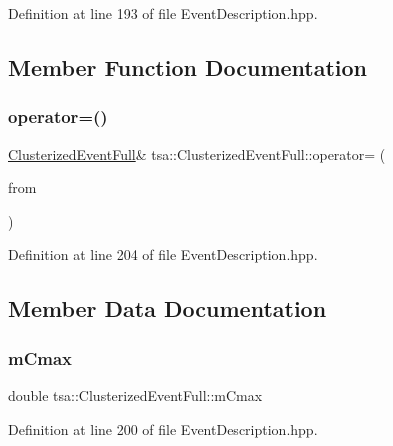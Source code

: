 Definition at line 193 of file Event\+Description.\+hpp.



\subsection{Member Function Documentation}
\mbox{\label{classtsa_1_1_clusterized_event_full_a59d5af3b33fe416f076a71e127e55e4b}} 
\subsubsection{\texorpdfstring{operator=()}{operator=()}}
{\footnotesize\ttfamily \hyperlink{classtsa_1_1_clusterized_event_full}{Clusterized\+Event\+Full}\& tsa\+::\+Clusterized\+Event\+Full\+::operator= (\begin{DoxyParamCaption}\item[{const \hyperlink{classtsa_1_1_clusterized_event_full}{Clusterized\+Event\+Full} \&}]{from }\end{DoxyParamCaption})\hspace{0.3cm}{\ttfamily [inline]}}



Definition at line 204 of file Event\+Description.\+hpp.



\subsection{Member Data Documentation}
\mbox{\label{classtsa_1_1_clusterized_event_full_a79694874453fcf2219e339c3d131ba27}} 
\subsubsection{\texorpdfstring{m\+Cmax}{mCmax}}
{\footnotesize\ttfamily double tsa\+::\+Clusterized\+Event\+Full\+::m\+Cmax}



Definition at line 200 of file Event\+Description.\+hpp.

